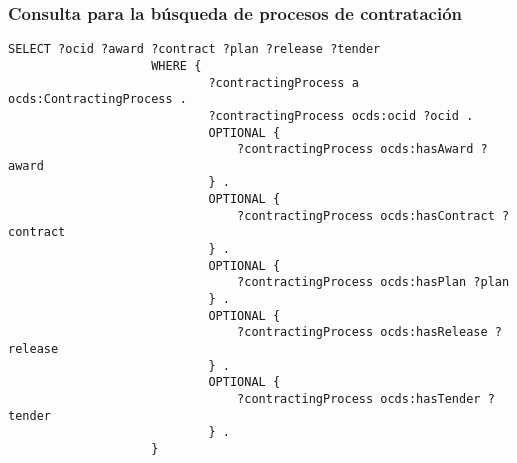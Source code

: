         \subsubsection{Consulta para la búsqueda de procesos de contratación}
            \begin{minipage}{\linewidth}
                \begin{lstlisting}[language=lSPARQL]
                    SELECT ?ocid ?award ?contract ?plan ?release ?tender
                    WHERE {
                            ?contractingProcess a ocds:ContractingProcess .
                            ?contractingProcess ocds:ocid ?ocid .
                            OPTIONAL {
                                ?contractingProcess ocds:hasAward ?award 
                            } .
                            OPTIONAL {
                                ?contractingProcess ocds:hasContract ?contract
                            } .
                            OPTIONAL {
                                ?contractingProcess ocds:hasPlan ?plan
                            } .
                            OPTIONAL {
                                ?contractingProcess ocds:hasRelease ?release
                            } .
                            OPTIONAL {
                                ?contractingProcess ocds:hasTender ?tender
                            } .
                    }
                \end{lstlisting}
            \end{minipage}

